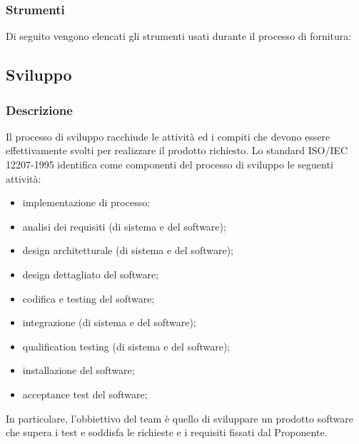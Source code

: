         \subsubsection{Strumenti}
        Di seguito vengono elencati gli strumenti usati durante il processo di fornitura:
        
    \subsection{Sviluppo}
        \subsubsection{Descrizione}
        Il processo di sviluppo racchiude le attività ed i compiti che devono essere effettivamente svolti per realizzare il prodotto richiesto.
       Lo standard ISO/IEC 12207-1995 identifica come componenti del processo di sviluppo le seguenti attività:
        \begin{itemize}
            \item{implementazione di processo;}
            \item{analisi dei requisiti (di sistema e del software);}
            \item{design architetturale (di sistema e del software);}
            \item{design dettagliato del software;}
            \item{codifica e testing del software;}
            \item{integrazione (di sistema e del software);}
            \item{qualification testing (di sistema e del software);}
            \item{installazione del software;}
            \item{acceptance test del software;}
        \end{itemize}
        In particolare, l'obbiettivo del team è quello di sviluppare un prodotto software che supera i test e soddisfa le richieste e i requisiti fissati dal Proponente.
            
